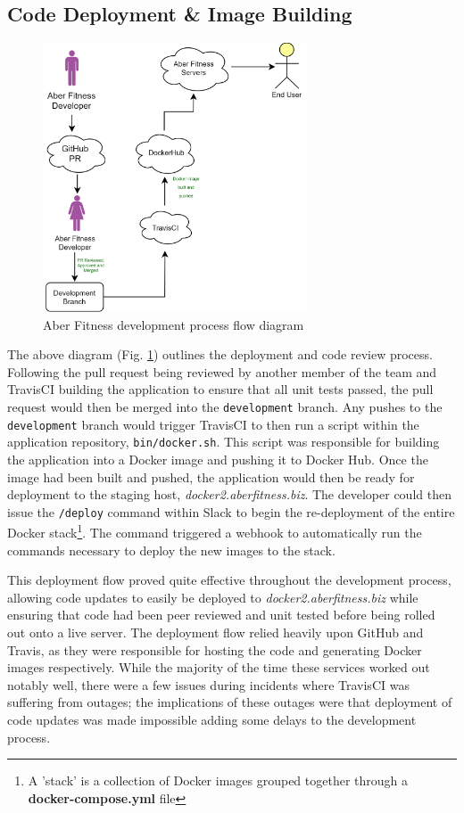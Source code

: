 
\subsection{Code Deployment \& Image Building}
\begin{figure}[H]
    \centering
    \includegraphics[width=0.7\textwidth]{Images/diagram_af.png}
    \caption{Aber Fitness development process flow diagram}
    \label{fig:development_flow_diagram}
\end{figure}

The above diagram (Fig. \ref{fig:development_flow_diagram}) outlines the deployment and code review process. Following the pull request being reviewed by another member of the team and TravisCI building the application to ensure that all unit tests passed, the pull request would then be merged into the \lstinline{development} branch. Any pushes to the \lstinline{development} branch would trigger TravisCI to then run a script within the application repository, \lstinline{bin/docker.sh}. This script was responsible for building the application into a Docker image and pushing it to Docker Hub. Once the image had been built and pushed, the application would then be ready for deployment to the staging host, \textit{docker2.aberfitness.biz}. The developer could then issue the \lstinline{/deploy} command within Slack to begin the re-deployment of the entire Docker stack\footnote{A 'stack' is a collection of Docker images grouped together through a \textbf{docker-compose.yml} file}. The command triggered a webhook to automatically run the commands necessary to deploy the new images to the stack. 

This deployment flow proved quite effective throughout the development process, allowing code updates to easily be deployed to \textit{docker2.aberfitness.biz} while ensuring that code had been peer reviewed and unit tested before being rolled out onto a live server. The deployment flow relied heavily upon GitHub and Travis, as they were responsible for hosting the code and generating Docker images respectively. While the majority of the time these services worked out notably well, there were a few issues during incidents where TravisCI was suffering from outages; the implications of these outages were that deployment of code updates was made impossible \textemdash adding some delays to the development process.


